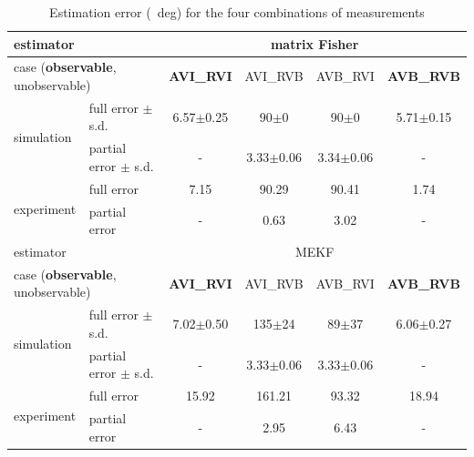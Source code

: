 \begin{table}
	\caption{Estimation error (\SI{}{deg}) for the four combinations of measurements \label{table:observability-error}}
	\centering
	\begin{tabular}{l|l|c|c|c|c}
		\hline\hline
		\multicolumn{2}{l|}{estimator} & \multicolumn{4}{c}{matrix Fisher} \\ \hline
		\multicolumn{2}{l|}{case (\textbf{observable}, unobservable)} & \textbf{AVI\_RVI} & AVI\_RVB & AVB\_RVI & \textbf{AVB\_RVB} \\ \hline
		\multirow{2}{*}{simulation} & full error $\pm$ s.d. & 6.57$\pm$0.25 & 90$\pm$0 & 90$\pm$0 & 5.71$\pm$0.15  \\
		& partial error $\pm$ s.d. & - & 3.33$\pm$0.06 & 3.34$\pm$0.06 & - \\ \hline
		\multirow{2}{*}{experiment} & full error & 7.15 & 90.29 & 90.41 & 1.74 \\
		& partial error & - & 0.63 & 3.02 & - \\ \hline\hline
		\multicolumn{2}{l|}{estimator} & \multicolumn{4}{c}{MEKF} \\ \hline
		\multicolumn{2}{l|}{case (\textbf{observable}, unobservable)} & \textbf{AVI\_RVI} & AVI\_RVB & AVB\_RVI & \textbf{AVB\_RVB} \\ \hline
		\multirow{2}{*}{simulation} & full error $\pm$ s.d. & 7.02$\pm$0.50 & 135$\pm$24 & 89$\pm$37 & 6.06$\pm$0.27 \\
		& partial error $\pm$ s.d. & - & 3.33$\pm$0.06 & 3.33$\pm$0.06 & - \\ \hline
		\multirow{2}{*}{experiment} & full error & 15.92 & 161.21 & 93.32 & 18.94 \\
		& partial error & - & 2.95 & 6.43 & - \\ \hline\hline
	\end{tabular}
\end{table}


